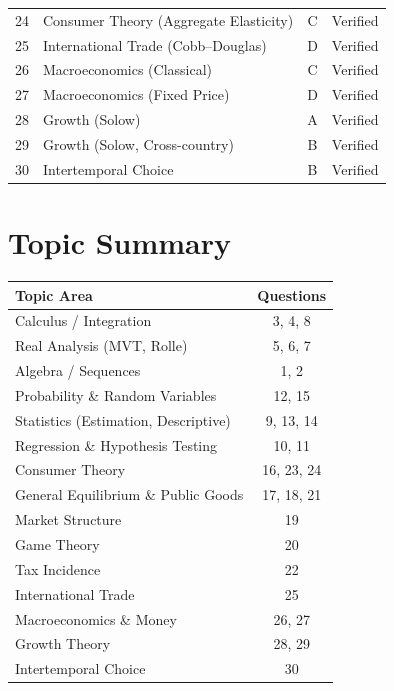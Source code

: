 \documentclass[11pt]{article}
\begin{document}
\begin{center}
\begin{tabular}{c l c c}
24 & Consumer Theory (Aggregate Elasticity)     & C & Verified \\
25 & International Trade (Cobb--Douglas)        & D & Verified \\
26 & Macroeconomics (Classical)                 & C & Verified \\
27 & Macroeconomics (Fixed Price)               & D & Verified \\
28 & Growth (Solow)                             & A & Verified \\
29 & Growth (Solow, Cross-country)              & B & Verified \\
30 & Intertemporal Choice                       & B & Verified \\
\bottomrule
\end{tabular}
\end{center}

\bigskip

\section*{Topic Summary}

\begin{center}
\begin{tabular}{l c}
\toprule
Topic Area & Questions \\
\midrule
Calculus / Integration                & 3, 4, 8 \\
Real Analysis (MVT, Rolle)            & 5, 6, 7 \\
Algebra / Sequences                   & 1, 2 \\
Probability \& Random Variables       & 12, 15 \\
Statistics (Estimation, Descriptive)  & 9, 13, 14 \\
Regression \& Hypothesis Testing      & 10, 11 \\
Consumer Theory                       & 16, 23, 24 \\
General Equilibrium \& Public Goods   & 17, 18, 21 \\
Market Structure                      & 19 \\
Game Theory                           & 20 \\
Tax Incidence                         & 22 \\
International Trade                   & 25 \\
Macroeconomics \& Money               & 26, 27 \\
Growth Theory                         & 28, 29 \\
Intertemporal Choice                  & 30 \\
\bottomrule
\end{tabular}
\end{center}
\end{document}
